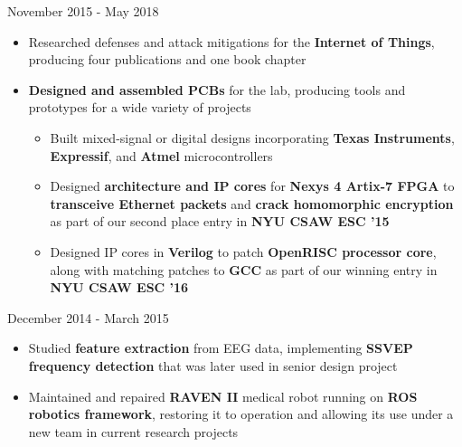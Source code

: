 \documentclass{my_resume}
\begin{document}
    {November 2015 - May 2018}
\begin{flushleft}
\begin{itemize}[noitemsep]
  \item Researched defenses and attack mitigations for the \textbf{Internet of Things}, producing four publications and one book chapter
  \item \textbf{Designed and assembled PCBs} for the lab, producing tools and prototypes for a wide variety of projects
  \begin{itemize}[noitemsep]
    \item Built mixed-signal or digital designs incorporating \textbf{Texas Instruments}, \textbf{Expressif}, and \textbf{Atmel} microcontrollers
    \item Designed \textbf{architecture and IP cores} for \textbf{Nexys 4 Artix-7 FPGA} to \textbf{transceive Ethernet packets} and \textbf{crack homomorphic encryption} as part of our second place entry in \textbf{NYU CSAW ESC '15}
    \item Designed IP cores in \textbf{Verilog} to patch \textbf{OpenRISC processor core}, along with matching patches to \textbf{GCC} as part of our winning entry in \textbf{NYU CSAW ESC '16}
  \end{itemize}
\end{itemize}
\end{flushleft}
	{December 2014 - March 2015}
\begin{flushleft}
\begin{itemize}[noitemsep]
  \item Studied \textbf{feature extraction} from EEG data, implementing \textbf{SSVEP frequency detection} that was later used in senior design project
  \item Maintained and repaired \textbf{RAVEN II} medical robot running on \textbf{ROS robotics framework}, restoring it to operation and allowing its use under a new team in current research projects
\end{itemize}
\end{flushleft}
\end{document}
